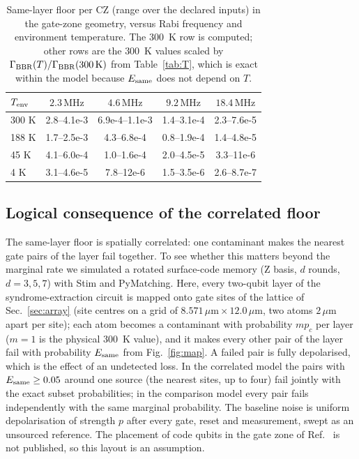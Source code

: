 \documentclass[aps,pra,twocolumn,superscriptaddress,longbibliography,floatfix]{revtex4-2}
\newcommand{\um}{\,\mu\mathrm{m}}
\newcommand{\MHz}{\,\mathrm{MHz}}
\begin{document}
\begin{table}[t]
\caption{Same-layer floor per CZ (range over the declared inputs) in the gate-zone geometry, versus Rabi frequency and environment temperature. The $300$~K row is computed; other rows are the $300$~K values scaled by $\Gamma_{\rm BBR}(T)/\Gamma_{\rm BBR}(300\,\mathrm{K})$ from Table~\ref{tab:T}, which is exact within the model because $E_{\rm same}$ does not depend on $T$.}
\label{tab:floor}
\begin{ruledtabular}
\begin{tabular}{lcccc}
$T_{\rm env}$ & $2.3\MHz$ & $4.6\MHz$ & $9.2\MHz$ & $18.4\MHz$\\ \hline
300 K & 2.8--4.1e-3 & 6.9e-4--1.1e-3 & 1.4--3.1e-4 & 2.3--7.6e-5\\
188 K & 1.7--2.5e-3 & 4.3--6.8e-4 & 0.8--1.9e-4 & 1.4--4.8e-5\\
45 K & 4.1--6.0e-4 & 1.0--1.6e-4 & 2.0--4.5e-5 & 3.3--11e-6\\
4 K & 3.1--4.6e-5 & 7.8--12e-6 & 1.5--3.5e-6 & 2.6--8.7e-7\\
\end{tabular}
\end{ruledtabular}
\end{table}


\subsection{Logical consequence of the correlated floor}
\label{sec:logical}

The same-layer floor is spatially correlated: one contaminant makes the nearest gate pairs of the layer fail together. To see whether this matters beyond the marginal rate we simulated a rotated surface-code memory (Z basis, $d$ rounds, $d=3,5,7$) with Stim and PyMatching. Here, every two-qubit layer of the syndrome-extraction circuit is mapped onto gate sites of the lattice of Sec.~\ref{sec:array} (site centres on a grid of $8.571\um\times12.0\um$, two atoms $2\um$ apart per site); each atom becomes a contaminant with probability $mp_c$ per layer ($m=1$ is the physical $300$~K value), and it makes every other pair of the layer fail with probability $E_{\rm same}$ from Fig.~\ref{fig:map}. A failed pair is fully depolarised, which is the effect of an undetected loss. In the correlated model the pairs with $E_{\rm same}\ge0.05$ around one source (the nearest sites, up to four) fail jointly with the exact subset probabilities; in the comparison model every pair fails independently with the same marginal probability. The baseline noise is uniform depolarisation of strength $p$ after every gate, reset and measurement, swept as an unsourced reference. The placement of code qubits in the gate zone of Ref.~\cite{Bluvstein2026} is not published, so this layout is an assumption.
\end{document}

